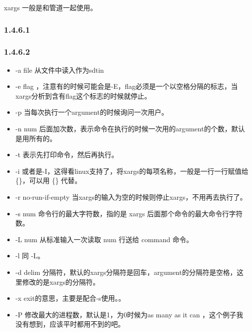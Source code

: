 \documentclass[letterpaper,12pt,english]{sphinxmanual}
\begin{document}
xargs 一般是和管道一起使用。


\subsubsection{1.4.6.1   }
\label{\detokenize{001software/001install/linux:id21}}
\begin{sphinxVerbatim}[commandchars=\\\{\}]
    
\end{sphinxVerbatim}


\subsubsection{1.4.6.2   }
\label{\detokenize{001software/001install/linux:id22}}\begin{itemize}
\item {} 
-a file 从文件中读入作为sdtin

\item {} 
-e flag
，注意有的时候可能会是-E，flag必须是一个以空格分隔的标志，当xargs分析到含有flag这个标志的时候就停止。

\item {} 
-p 当每次执行一个argument的时候询问一次用户。

\item {} 
-n num
后面加次数，表示命令在执行的时候一次用的argument的个数，默认是用所有的。

\item {} 
-t 表示先打印命令，然后再执行。

\item {} 
-i
或者是-I，这得看linux支持了，将xargs的每项名称，一般是一行一行赋值给
\{\}，可以用 \{\} 代替。

\item {} 
-r no-run-if-empty
当xargs的输入为空的时候则停止xargs，不用再去执行了。

\item {} 
-s num 命令行的最大字符数，指的是 xargs
后面那个命令的最大命令行字符数。

\item {} 
-L num 从标准输入一次读取 num 行送给 command 命令。

\item {} 
-l 同 -L。

\item {} 
-d delim
分隔符，默认的xargs分隔符是回车，argument的分隔符是空格，这里修改的是xargs的分隔符。

\item {} 
-x exit的意思，主要是配合-s使用。。

\item {} 
-P 修改最大的进程数，默认是1，为0时候为as many as
it can ，这个例子我没有想到，应该平时都用不到的吧。

\end{itemize}
\end{document}
